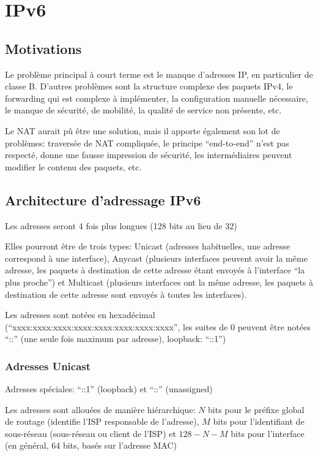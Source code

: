 \documentclass{report}
\begin{document}
\chapter{IPv6}

\section{Motivations}

Le problème principal à court terme est le manque d'adresses IP, en
particulier de classe B. D'autres problèmes sont la structure complexe
des paquets IPv4, le forwarding qui est complexe à implémenter, la
configuration manuelle nécessaire, le manque de sécurité, de mobilité,
la qualité de service non présente, etc.

Le NAT aurait pû être une solution, mais il apporte également son lot
de problèmes: traversée de NAT compliquée, le principe ``end-to-end''
n'est pas respecté, donne une fausse impression de sécurité, les
intermédiaires peuvent modifier le contenu des paquets, etc.

\section{Architecture d'adressage IPv6}

Les adresses seront 4 fois plus longues (128 bits au lieu de 32)

Elles pourront être de trois types: Unicast (adresses habituelles, une
adresse correspond à une interface), Anycast (plusieurs interfaces
peuvent avoir la même adresse, les paquets à destination de cette
adresse étant envoyés à l'interface ``la plus proche'') et Multicast
(plusieurs interfaces ont la même adresse, les paquets à destination
de cette adresse sont envoyés à toutes les interfaces).

Les adresses sont notées en hexadécimal
(``xxxx:xxxx:xxxx:xxxx:xxxx:xxxx:xxxx:xxxx'', les suites de 0 peuvent
être notées ``::'' (une seule fois maximum par adresse), loopback:
``::1'')

\subsection{Adresses Unicast}

Adresses spéciales: ``::1'' (loopback) et ``::'' (unassigned)

Les adresses sont allouées de manière hiérarchique: $N$ bits pour le
préfixe global de routage (identifie l'ISP responsable de l'adresse),
$M$ bits pour l'identifiant de sous-réseau (sous-réseau ou client de
l'ISP) et $128-N-M$ bits pour l'interface (en général, 64 bits, basés
sur l'adresse MAC)
\end{document}
